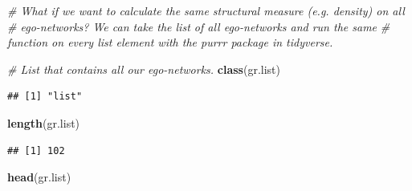 \documentclass[
]{book}
\newenvironment{Shaded}{\begin{snugshade}}{\end{snugshade}}
\newcommand{\CommentTok}[1]{\textcolor[rgb]{0.56,0.35,0.01}{\textit{#1}}}
\newcommand{\FunctionTok}[1]{\textcolor[rgb]{0.13,0.29,0.53}{\textbf{#1}}}
\newcommand{\NormalTok}[1]{#1}
\begin{document}
\begin{Shaded}
\begin{Highlighting}[]
\CommentTok{\# What if we want to calculate the same structural measure (e.g. density) on all}
\CommentTok{\# ego{-}networks? We can take the list of all ego{-}networks and run the same }
\CommentTok{\# function on every list element with the purrr package in tidyverse.}

\CommentTok{\# List that contains all our ego{-}networks.}
\FunctionTok{class}\NormalTok{(gr.list)}
\end{Highlighting}
\end{Shaded}

\begin{verbatim}
## [1] "list"
\end{verbatim}

\begin{Shaded}
\begin{Highlighting}[]
\FunctionTok{length}\NormalTok{(gr.list)}
\end{Highlighting}
\end{Shaded}

\begin{verbatim}
## [1] 102
\end{verbatim}

\begin{Shaded}
\begin{Highlighting}[]
\FunctionTok{head}\NormalTok{(gr.list)}
\end{Highlighting}
\end{Shaded}
\end{document}
